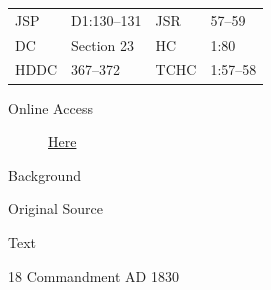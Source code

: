 				\begin{tabular}{p{0.5in}p{1in}p{0.5in}p{1in}}
				JSP	 	& D1:130--131	& JSR 		& 57--59	 \\
				DC	 	& Section 23	& HC 		& 1:80		 \\
				HDDC 	& 367--372		& TCHC 		& 1:57--58 \\
				\end{tabular}
			
			\begin{description}
				\item[Online Access] \href{https://www.josephsmithpapers.org/paper-summary/revelation-april-1830-a-dc-231-2/1}{Here}
			\end{description}
			
			\begin{description}
				\item[Background]
			\end{description}
			
			
			\begin{description}
				\item[Original Source]
			\end{description}
			
			
			\begin{description}
				\item[Text]
			\end{description}
			
				\begin{tightcenter}
				18 Commandment AD 1830
				\end{tightcenter}
				
